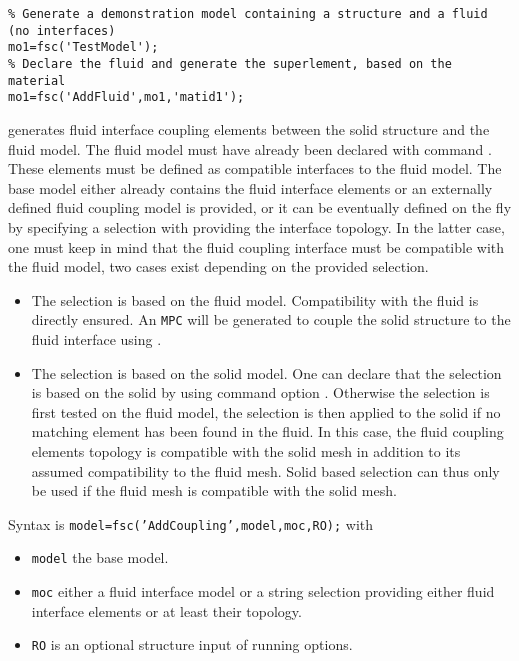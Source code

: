 \begin{SDT}
\begin{verbatim}
% Generate a demonstration model containing a structure and a fluid (no interfaces)
mo1=fsc('TestModel');
% Declare the fluid and generate the superlement, based on the material
mo1=fsc('AddFluid',mo1,'matid1');
\end{verbatim}%


 generates fluid interface coupling elements between the solid structure and the fluid model. The fluid model must have already been declared with command . These elements must be defined as compatible interfaces to the fluid model.
The base model either already contains the fluid interface elements or an externally defined fluid coupling model is provided, or it can be eventually defined on the fly by specifying a selection with  providing the interface topology. In the latter case, one must keep in mind that the fluid coupling interface must be compatible with the fluid model, two cases exist depending on the provided selection.
\begin{itemize}
\item The  selection is based on the fluid model. Compatibility with the fluid is directly ensured. An {\tt MPC} will be generated to couple the solid structure to the fluid interface using .
\item The  selection is based on the solid model. One can declare that the selection is based on the solid by using command option . Otherwise the selection is first tested on the fluid model, the selection is then applied to the solid if no matching element has been found in the fluid. In this case, the fluid coupling elements topology is compatible with the solid mesh in addition to its assumed compatibility to the fluid mesh. Solid based selection can thus only be used if the fluid mesh is compatible with the solid mesh.
\end{itemize}

Syntax is {\tt model=fsc('AddCoupling',model,moc,RO);} with
\begin{itemize}
\item {\tt model} the base model.
\item {\tt moc}  either a fluid interface model or a string  selection providing either fluid interface elements or at least their topology.
\item {\tt RO} is an optional structure input of running options.
\end{itemize}


\end{SDT}
